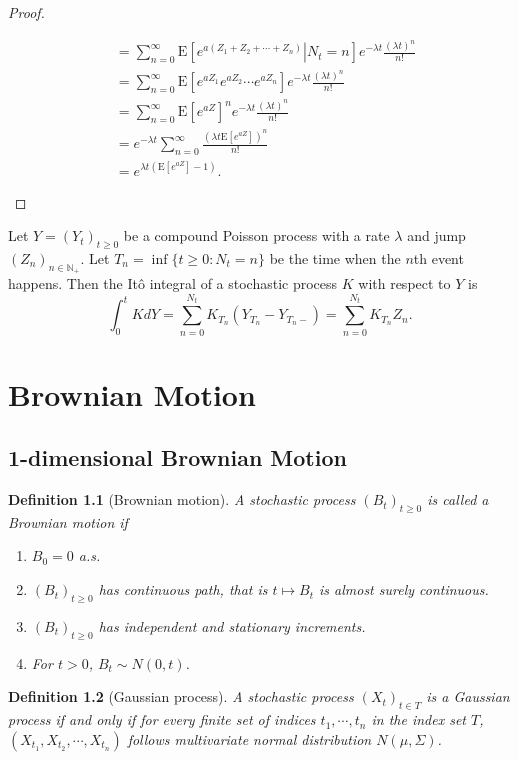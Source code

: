 \documentclass{report}
\newtheorem{definition}{Definition}[section]
\theoremstyle{nonumberplain}
\newtheorem{proof}{Proof.}
\begin{document}
\begin{proof}
\begin{enumerate}
\[\begin{aligned}
	&=\sum_{n=0}^{\infty}\mathrm{E}\left[\left.e^{a\left(Z_1+Z_2+\cdots+Z_{n}\right)}\right|N_t=n\right]e^{-\lambda t}\frac{\left(\lambda t\right)^n}{n!}\\
	&=\sum_{n=0}^{\infty}\mathrm{E}\left[e^{aZ_1}e^{aZ_2}\cdots e^{aZ_{n}}\right]e^{-\lambda t}\frac{\left(\lambda t\right)^n}{n!}\\
	&=\sum_{n=0}^{\infty}\mathrm{E}\left[e^{aZ}\right]^ne^{-\lambda t}\frac{\left(\lambda t\right)^n}{n!}\\
	&=e^{-\lambda t}\sum_{n=0}^{\infty}\frac{\left(\lambda t\mathrm{E}\left[e^{aZ}\right]\right)^n}{n!}\\
	&=e^{\lambda t\left(\mathrm{E}\left[e^{aZ}\right]-1\right)}.
 	\end{aligned}
 	\]
\end{enumerate}
\end{proof}
Let $Y=(Y_t)_{t\ge 0}$ be a compound Poisson process with a rate $\lambda$ and jump $(Z_n)_{n\in \mathbb{N}_+}$. Let $T_n=\inf\{t\ge0:N_t= n\}$ be the time when the $n$th event happens. Then the Itô integral of a stochastic process $K$ with respect to $Y$ is
\[
\int_{0}^{t}KdY=\sum_{n=0}^{N_t}K_{T_n}(Y_{T_n}-Y_{T_n-})=\sum_{n=0}^{N_t}K_{T_n}Z_n.
\]




\chapter{Brownian Motion}
\section{1-dimensional Brownian Motion}
\begin{definition}[Brownian motion]
	A stochastic process $(B_t)_{t\ge0}$ is called a \emph{Brownian motion} if
	\begin{enumerate}
		\item $B_0=0$ a.s.
		\item $(B_t)_{t\ge0}$ has continuous path, that is $t\mapsto B_t$ is almost surely continuous.
		\item $(B_t)_{t\ge0}$ has independent and stationary increments.
		\item For $t>0$, $B_t\sim N(0,t)$.
	\end{enumerate}
\end{definition}

\begin{definition}[Gaussian process]
	A stochastic process $(X_t)_{t\in T}$ is a \emph{Gaussian process} if and only if for every finite set of indices $t_{1},\cdots ,t_{n}$ in the index set $T$, $(X_{t_1},X_{t_2},\cdots,X_{t_n})$ follows multivariate normal distribution $N(\mu,\Sigma)$.
\end{definition}
\end{document}

